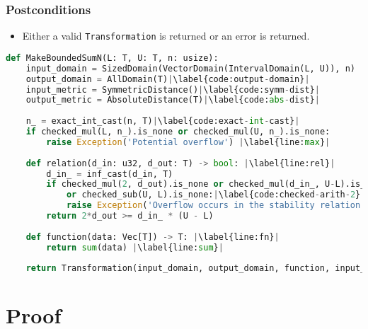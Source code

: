 \documentclass[11pt,a4paper]{article}
\theoremstyle{definition}
\begin{document}
\subsubsection*{Postconditions}
\begin{itemize}
    \item Either a valid \texttt{Transformation} is returned or an error is returned.
\end{itemize}

\begin{lstlisting}[language=Python, escapechar=|]
def MakeBoundedSumN(L: T, U: T, n: usize):
    input_domain = SizedDomain(VectorDomain(IntervalDomain(L, U)), n)
    output_domain = AllDomain(T)|\label{code:output-domain}|
    input_metric = SymmetricDistance()|\label{code:symm-dist}|
    output_metric = AbsoluteDistance(T)|\label{code:abs-dist}|
    
    n_ = exact_int_cast(n, T)|\label{code:exact-int-cast}|
    if checked_mul(L, n_).is_none or checked_mul(U, n_).is_none: 
        raise Exception('Potential overflow') |\label{line:max}|
    
    def relation(d_in: u32, d_out: T) -> bool: |\label{line:rel}|
        d_in_ = inf_cast(d_in, T)
        if checked_mul(2, d_out).is_none or checked_mul(d_in_, U-L).is_none|\label{code:checked-arith-1}|
            or checked_sub(U, L).is_none:|\label{code:checked-arith-2}|
            raise Exception('Overflow occurs in the stability relation')
        return 2*d_out >= d_in_ * (U - L)
    
    def function(data: Vec[T]) -> T: |\label{line:fn}|
        return sum(data) |\label{line:sum}|
    
    return Transformation(input_domain, output_domain, function, input_metric, output_metric, stability_relation = relation)
\end{lstlisting}

\section{Proof}
\end{document}
